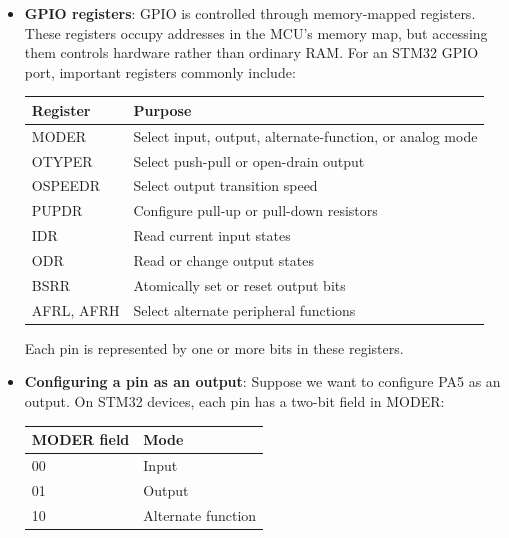 \documentclass{report}
\begin{document}
\begin{itemize}
        \item \textbf{GPIO registers}: GPIO is controlled through memory-mapped registers. These registers occupy addresses in the MCU’s memory map, but accessing them controls hardware rather than ordinary RAM.
            \bigbreak \noindent 
            For an STM32 GPIO port, important registers commonly include:
            \begin{center}
                \begin{tabularx}{\textwidth}{@{}XX@{}}
                    \toprule
                    \textbf{Register}&	\textbf{Purpose} \\
                    \midrule
                    MODER	&Select input, output, alternate-function, or analog mode\\[2ex]
                    OTYPER	&Select push-pull or open-drain output\\[2ex]
                    OSPEEDR	&Select output transition speed\\[2ex]
                    PUPDR	&Configure pull-up or pull-down resistors\\[2ex]
                    IDR	&Read current input states\\[2ex]
                    ODR	&Read or change output states\\[2ex]
                    BSRR	&Atomically set or reset output bits\\[2ex]
                    AFRL, AFRH	&Select alternate peripheral functions \\
                    \bottomrule
                \end{tabularx}
            \end{center}
            Each pin is represented by one or more bits in these registers.
        \item \textbf{Configuring a pin as an output}: Suppose we want to configure PA5 as an output.
            \bigbreak \noindent 
            On STM32 devices, each pin has a two-bit field in MODER:
            \begin{center}
                \begin{tabularx}{\textwidth}{@{}XX@{}}
                    \toprule
                    \textbf{MODER field} &\textbf{Mode} \\
                    \midrule
                    00	&Input\\[2ex]
                    01	&Output\\[2ex]
                    10	&Alternate function\\[2ex]

\end{tabularx}
\end{center}
\end{itemize}
\end{document}

